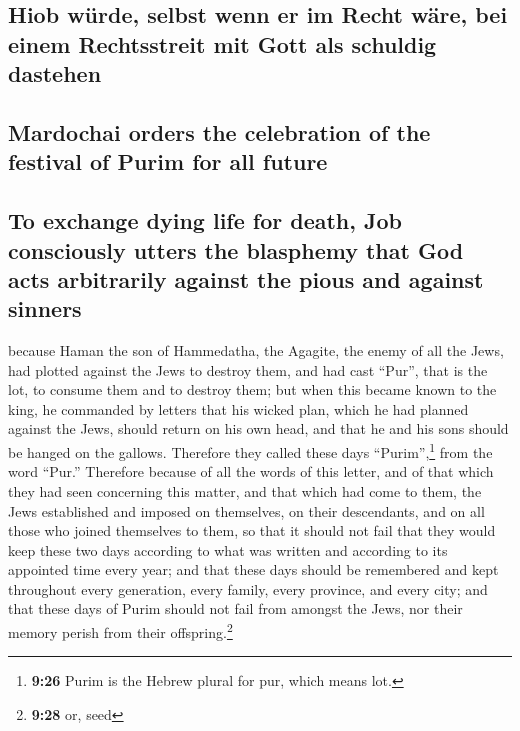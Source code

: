 \hypertarget{hiob-wuxfcrde-selbst-wenn-er-im-recht-wuxe4re-bei-einem-rechtsstreit-mit-gott-als-schuldig-dastehen}{%
\subsection{Hiob würde, selbst wenn er im Recht wäre, bei einem
Rechtsstreit mit Gott als schuldig
dastehen}\label{hiob-wuxfcrde-selbst-wenn-er-im-recht-wuxe4re-bei-einem-rechtsstreit-mit-gott-als-schuldig-dastehen}}

\hypertarget{mardochai-orders-the-celebration-of-the-festival-of-purim-for-all-future}{%
\subsection{Mardochai orders the celebration of the festival of Purim
for all
future}\label{mardochai-orders-the-celebration-of-the-festival-of-purim-for-all-future}}

\hypertarget{to-exchange-dying-life-for-death-job-consciously-utters-the-blasphemy-that-god-acts-arbitrarily-against-the-pious-and-against-sinners}{%
\subsection{To exchange dying life for death, Job consciously utters the
blasphemy that God acts arbitrarily against the pious and against
sinners}\label{to-exchange-dying-life-for-death-job-consciously-utters-the-blasphemy-that-god-acts-arbitrarily-against-the-pious-and-against-sinners}}

 because Haman the son of Hammedatha, the Agagite, the
enemy of all the Jews, had plotted against the Jews to destroy them, and
had cast ``Pur'', that is the lot, to consume them and to destroy them;
 but when this became known to the king, he commanded by
letters that his wicked plan, which he had planned against the Jews,
should return on his own head, and that he and his sons should be hanged
on the gallows.  Therefore they called these days
``Purim'',\footnote{\textbf{9:26} Purim is the Hebrew plural for pur,
  which means lot.} from the word ``Pur.'' Therefore because of all the
words of this letter, and of that which they had seen concerning this
matter, and that which had come to them,  the Jews
established and imposed on themselves, on their descendants, and on all
those who joined themselves to them, so that it should not fail that
they would keep these two days according to what was written and
according to its appointed time every year;  and that
these days should be remembered and kept throughout every generation,
every family, every province, and every city; and that these days of
Purim should not fail from amongst the Jews, nor their memory perish
from their offspring.\footnote{\textbf{9:28} or, seed}

